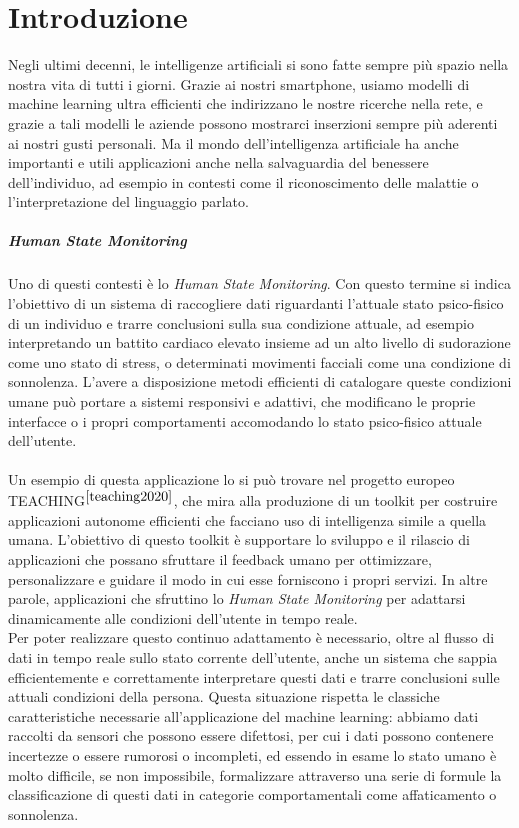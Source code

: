 \chapter*{Introduzione}

Negli ultimi decenni, le intelligenze artificiali si sono fatte sempre più spazio nella nostra vita di tutti i giorni. Grazie ai nostri smartphone, usiamo modelli di machine learning ultra efficienti che indirizzano le nostre ricerche nella rete, e grazie a tali modelli le aziende possono mostrarci inserzioni sempre più aderenti ai nostri gusti personali. Ma il mondo dell'intelligenza artificiale ha anche importanti e utili applicazioni anche nella salvaguardia del benessere dell'individuo, ad esempio in contesti come il riconoscimento delle malattie o l'interpretazione del linguaggio parlato.

\paragraph{Human State Monitoring} Uno di questi contesti è lo \textit{Human State Monitoring}. Con questo termine si indica l'obiettivo di un sistema di raccogliere dati riguardanti l'attuale stato psico-fisico di un individuo e trarre conclusioni sulla sua condizione attuale, ad esempio interpretando un battito cardiaco elevato insieme ad un alto livello di sudorazione come uno stato di stress, o determinati movimenti facciali come una condizione di sonnolenza. L'avere a disposizione metodi efficienti di catalogare queste condizioni umane può portare a sistemi responsivi e adattivi, che modificano le proprie interfacce o i propri comportamenti accomodando lo stato psico-fisico attuale dell'utente.\\\\
Un esempio di questa applicazione lo si può trovare nel progetto europeo\\TEACHING$^{\cite{teaching2020}}$, che mira alla produzione di un toolkit per costruire applicazioni autonome efficienti che facciano uso di intelligenza simile a quella umana. L'obiettivo di questo toolkit è supportare lo sviluppo e il rilascio di applicazioni che possano sfruttare il feedback umano per ottimizzare, personalizzare e guidare il modo in cui esse forniscono i propri servizi. In altre parole, applicazioni che sfruttino lo \textit{Human State Monitoring} per adattarsi dinamicamente alle condizioni dell'utente in tempo reale.\\
Per poter realizzare questo continuo adattamento è necessario, oltre al flusso di dati in tempo reale sullo stato corrente dell'utente, anche un sistema che sappia efficientemente e correttamente interpretare questi dati e trarre conclusioni sulle attuali condizioni della persona. Questa situazione rispetta le classiche caratteristiche necessarie all'applicazione del machine learning: abbiamo dati raccolti da sensori che possono essere difettosi, per cui i dati possono contenere incertezze o essere rumorosi o incompleti, ed essendo in esame lo stato umano è molto difficile, se non impossibile, formalizzare attraverso una serie di formule la classificazione di questi dati in categorie comportamentali come affaticamento o sonnolenza.

